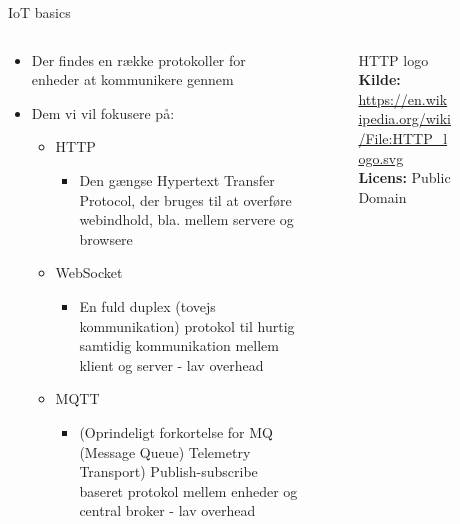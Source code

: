 \documentclass[aspectratio=169]{beamer}
\begin{document}
\begin{frame}{IoT basics}
\begin{columns}
	\begin{column}{0.6\textwidth}
		\begin{textBox}
			\begin{itemize}
				\item Der findes en række protokoller for enheder at kommunikere gennem
				\item Dem vi vil fokusere på:
				\begin{itemize}
					\item HTTP
						\begin{itemize}
							\item Den gængse Hypertext Transfer Protocol, der bruges til at overføre webindhold, bla. mellem servere og browsere
						\end{itemize}
					\item WebSocket
						\begin{itemize}
							\item En fuld duplex (tovejs kommunikation) protokol til hurtig samtidig kommunikation mellem klient og server - lav overhead
						\end{itemize}
					\item MQTT
						\begin{itemize}
							\item (Oprindeligt forkortelse for MQ (Message Queue) Telemetry Transport) Publish-subscribe baseret protokol mellem enheder og central broker - lav overhead
						\end{itemize}
				\end{itemize}
			\end{itemize}
		\end{textBox}
	\end{column}
	\begin{column}{0.4\textwidth}
		\centering
		\captionsetup{format=tcbcaptionsmall}
		\begin{columns}
			\begin{column}{0.45\textwidth}
				\begin{figure}[height=0.2\textheight]
  					
  					\caption{HTTP logo
  					\captionline \textbf{Kilde:} \url{https://en.wikipedia.org/wiki/File:HTTP_logo.svg}
  					\captionline \textbf{Licens:} Public Domain}
  					\label{fig:http-logo}
				\end{figure}
			\end{column}
			\begin{column}{0.45\textwidth}

\end{column}
\end{columns}
\end{column}
\end{columns}
\end{frame}
\end{document}
